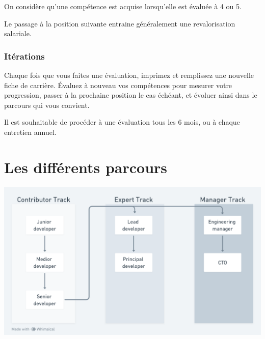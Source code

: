 \documentclass[a4paper, french, openany, 12pt]{book}
\begin{document}
\begin{multicols}{2}
  On considère qu'une compétence est acquise lorsqu'elle est évaluée à 4 ou 5.

  Le passage à la position suivante entraine généralement une revalorisation salariale.

  \section*{Itérations}

  Chaque fois que vous faites une évaluation, imprimez et remplissez une nouvelle fiche de carrière.
  Évaluez à nouveau vos compétences pour mesurer votre progression, passer à la prochaine position le cas échéant,
  et évoluer ainsi dans le parcours qui vous convient.

  Il est souhaitable de procéder à une évaluation tous les 6 mois, ou à chaque entretien annuel.

\end{multicols}

\part{Les différents parcours}

\includegraphics[width=\textwidth]{images/tracks.png}
\end{document}
